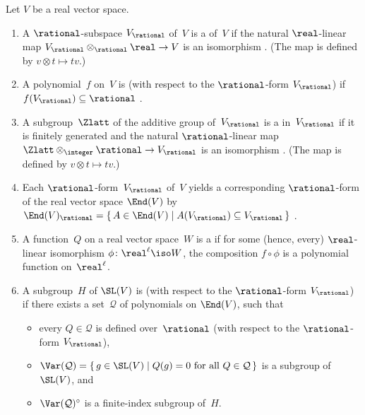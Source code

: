 \begin{defns} \label{DefdQAbstract}
 Let $V$ be a real vector space.
 \begin{enumerate}
 \item
 A $\rational$-subspace $V_{\rational}$ of~$V$ is a
 of~$V$ if the natural $\real$-linear
map $V_{\rational} \otimes_{\rational} \real \to V$ is an isomorphism
. (The map is defined
by $v \otimes t \mapsto tv$.)
 \item 
 A polynomial~$f$ on~$V$ is  (with respect to the $\rational$-form
$V_{\rational}$) if $f(V_{\rational}) \subseteq \rational$
.
 \item
 A subgroup~$\Zlatt$ of the additive
group of~$V_{\rational}$ is a 
in~$V_{\rational}$ if it is finitely generated and the natural $\rational$-linear map $\Zlatt \otimes_{\integer} \rational  \to V_{\rational}$ is an isomorphism
.  (The map is defined
by $v \otimes t \mapsto tv$.)

 \item Each $\rational$-form~$V_{\rational}$ of~$V$
yields a corresponding $\rational$-form of the real
vector space $\End(V)$ by
 $ \End(V)_{\rational} = \{\, A \in \End(V) \mid
A(V_{\rational}) \subseteq V_{\rational} \,\} $
 .
 \item A function~$Q$ on a real vector space~$W$ is a
 if for
some (hence, every) $\real$-linear isomorphism $\phi \colon
\real^\ell \iso W$, the composition $f \circ \phi$ is a
polynomial function on~$\real^\ell$.
 \item A subgroup~$H$ of $\SL(V)$ is
 (with
respect to the $\rational$-form $V_{\rational}$) if there
exists a set~$\mathcal{Q}$ of polynomials on $\End(V)$, such
that 
 \begin{itemize}
 \item every $Q \in \mathcal{Q}$ is defined
over~$\rational$ (with respect to the $\rational$-form
$V_{\rational}$),
 \item 
 $\Var(\mathcal{Q}) = \{\, g \in \SL(V) \mid
\mbox{$Q(g) = 0$ for all $Q \in \mathcal{Q}$} \,\}$
 is a subgroup of $\SL(V)$, and
 \item $\Var(\mathcal{Q})^\circ$ is a finite-index subgroup of~$H$.
 \end{itemize}
 \end{enumerate}
 \end{defns}

